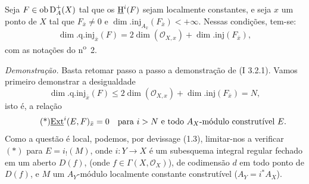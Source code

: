 Seja $F\in\operatorname{ob}\mathrm{D}_A^+(X)$ tal que os $\underline{\mathrm H}^i(F)$ sejam localmente constantes, e seja $x$ um ponto de $X$ tal que $F_{\bar{x}}\neq0$ e $\dim.\mathrm{inj}_{A_{\bar{x}}}(F_{\bar{x}})<+\infty$. Nessas condições, tem-se:
\[
        \dim.\mathrm{q.inj}_{\bar{x}}(F)=2\dim(\mathcal{O}_{X,x})+\dim.\mathrm{inj}(F_{\bar{x}}),
\]
com as notações do n\textsuperscript{o}~2.

\emph{Demonstração.} Basta retomar passo a passo a demonstração de (I 3.2.1). Vamos primeiro demonstrar a desigualdade
\[
        \dim.\mathrm{q.inj}_{\bar{x}}(F)\leq 2\dim(\mathcal{O}_{X,x})+\dim.\mathrm{inj}(F_{\bar{x}})=N,
\]
isto é, a relação
\begin{equation}\tag{*}
        \underline{\operatorname{Ext}}^{i}(E,F)_{\bar{x}}=0\quad\hbox{para } i>N\hbox{ e todo }A_X\hbox{-módulo construtível }E.
\end{equation}
Como a questão é local, podemos, por devissage (1.3), limitar-nos a verificar $(*)$ para $E=i_!(M)$, onde $i:Y\to X$ é um subesquema integral regular fechado em um aberto $D(f)$, (onde $f\in\Gamma(X,\mathcal{O}_X)$), de codimensão $d$ em todo ponto de $D(f)$, e $M$ um $A_Y$-módulo localmente constante construtível ($A_Y=i^*A_X$).

